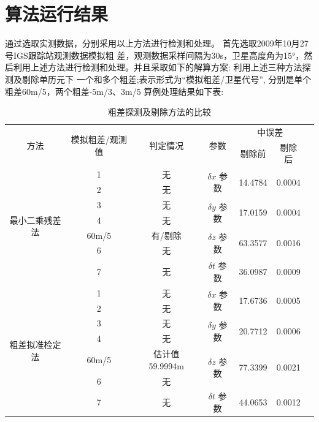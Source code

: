 \documentclass[12pt,hyperref,a4paper,UTF8]{ctexart}
\begin{document}
\section{算法运行结果}
通过选取实测数据，分别采用以上方法进行检测和处理。
首先选取2009年10月27号IGS跟踪站观测数据模拟粗
差，观测数据采样间隔为30s，卫星高度角为15°，然
后利用上述方法进行检测和处理。并且采取如下的解算方案:
利用上述三种方法探测及剔除单历元下
一个和多个粗差;表示形式为“模拟粗差/卫星代号”\cite{8},
分别是单个粗差60m/5，两个粗差-5m/3、3m/5
算例处理结果如下表:
\begin{table}[h]
    \centering
    \caption{粗差探测及剔除方法的比较}
    \label{tab:comparison}
    \begin{tabular}{ccccccc}
    \toprule
    \multirow{2}{*}{方法} & \multirow{2}{*}{模拟粗差/观测值} & \multirow{2}{*}{判定情况} & \multirow{2}{*}{参数} & \multicolumn{2}{c}{中误差} \\
    \cmidrule(lr){5-6}
     &  &  &  & 剔除前 & 剔除后 \\
    \midrule
    \multirow{7}{*}{最小二乘残差法} & 1 & 无 & \multirow{2}{*}{$\delta x$ 参数} & \multirow{2}{*}{14.4784} & \multirow{2}{*}{0.0004} \\
     & 2 & 无 &  & &  \\
     & 3 & 无 & \multirow{2}{*}{$\delta y$ 参数} &\multirow{2}{*}{17.0159}  & \multirow{2}{*}{0.0004} \\
     & 4 & 无 &  & &  \\
     & 60m/5 & 有/剔除 & \multirow{2}{*}{$\delta z$ 参数} &\multirow{2}{*}{63.3577}  & \multirow{2}{*}{0.0016} \\
     & 6 & 无 &  &  &  \\
     & 7 & 无 & $\delta t$ 参数 & 36.0987 & 0.0009 \\
    \hline
    \multirow{7}{*}{粗差拟准检定法} & 1 & 无 & \multirow{2}{*}{$\delta x$ 参数} & \multirow{2}{*}{17.6736} &\multirow{2}{*}{0.0005}  \\
     & 2 & 无 &  & & \\
     & 3 & 无 & \multirow{2}{*}{$\delta y$ 参数} & \multirow{2}{*}{20.7712} & \multirow{2}{*}{0.0006} \\
     & 4 & 无 &  &  &  \\
     & 60m/5 & 估计值 59.9994m & \multirow{2}{*}{$\delta z$ 参数} & \multirow{2}{*}{77.3399} & \multirow{2}{*}{0.0021} \\
     & 6 & 无 &  &  &  \\
     & 7 & 无 & $\delta t$ 参数 & 44.0653 & 0.0012 \\
    \hline

\end{tabular}
\end{table}
\end{document}
